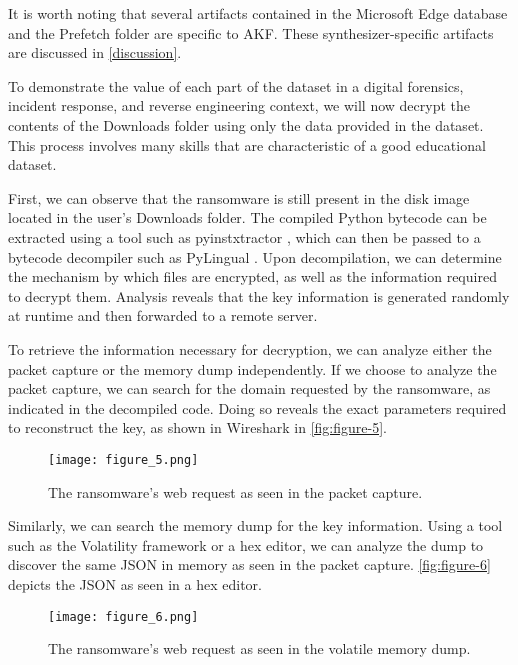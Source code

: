 \documentclass[preprint,12pt]{elsarticle}
\begin{document}
It is worth noting that several artifacts contained in the Microsoft
Edge database and the Prefetch folder are specific to AKF. These
synthesizer-specific artifacts are discussed in \autoref{discussion}.

To demonstrate the value of each part of the dataset in a digital
forensics, incident response, and reverse engineering context, we will
now decrypt the contents of the Downloads folder using only the data
provided in the dataset. This process involves many skills that are
characteristic of a good educational dataset.

First, we can observe that the ransomware is still present in the disk
image located in the user's Downloads folder. The compiled Python
bytecode can be extracted using a tool such as pyinstxtractor
\citep{extremecodersExtremecodersrePyinstxtractor2025}, which can
then be passed to a bytecode decompiler such as PyLingual
\citep{wiedemeierPYLINGUALPerfectDecompilation2024}. Upon
decompilation, we can determine the mechanism by which files are
encrypted, as well as the information required to decrypt them. Analysis
reveals that the key information is generated randomly at runtime and
then forwarded to a remote server.

To retrieve the information necessary for decryption, we can analyze
either the packet capture or the memory dump independently. If we choose
to analyze the packet capture, we can search for the domain requested by
the ransomware, as indicated in the decompiled code. Doing so reveals
the exact parameters required to reconstruct the key, as shown in
Wireshark in \autoref{fig:figure-5}.

\begin{figure}[htbp]
\centering
\texttt{[image: figure\_5.png]}
\caption{The ransomware's web request as seen in the packet
capture.}\label{fig:figure-5}
\end{figure}

Similarly, we can search the memory dump for the key information. Using
a tool such as the Volatility framework or a hex editor, we can analyze
the dump to discover the same JSON in memory as seen in the packet
capture. \autoref{fig:figure-6} depicts the JSON as seen in a hex
editor.

\begin{figure}[htbp]
\centering
\texttt{[image: figure\_6.png]}
\caption{The ransomware's web request as seen in the volatile memory
dump.}\label{fig:figure-6}
\end{figure}
\end{document}
